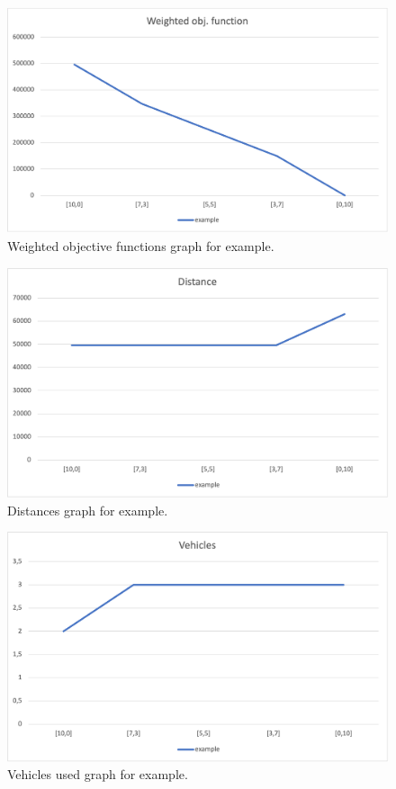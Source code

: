 \begin{figure}[H]
    \centering
    \includegraphics[height=0.25\textheight]{../graphs/example-wobjf.png}
    \caption{Weighted objective functions graph for example.}
\end{figure}

\begin{figure}[H]
    \centering
    \includegraphics[height=0.25\textheight]{../graphs/example-distance.png}
    \caption{Distances graph for example.}
\end{figure}

\begin{figure}[H]
    \centering
    \includegraphics[height=0.25\textheight]{../graphs/example-vehicles.png}
    \caption{Vehicles used graph for example.}
\end{figure}

\newpage